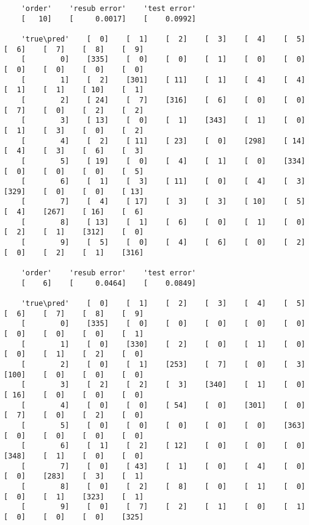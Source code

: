 \documentclass[fleqn]{article}
\theoremstyle{definition}
\theoremstyle{remark}
\begin{document}
\begin{verbatim}
    'order'    'resub error'    'test error'
    [   10]    [     0.0017]    [    0.0992]

    'true\pred'    [  0]    [  1]    [  2]    [  3]    [  4]    [  5]    [  6]    [  7]    [  8]    [  9]
    [        0]    [335]    [  0]    [  0]    [  1]    [  0]    [  0]    [  0]    [  0]    [  0]    [  0]
    [        1]    [  2]    [301]    [ 11]    [  1]    [  4]    [  4]    [  1]    [  1]    [ 10]    [  1]
    [        2]    [ 24]    [  7]    [316]    [  6]    [  0]    [  0]    [  7]    [  0]    [  2]    [  2]
    [        3]    [ 13]    [  0]    [  1]    [343]    [  1]    [  0]    [  1]    [  3]    [  0]    [  2]
    [        4]    [  2]    [ 11]    [ 23]    [  0]    [298]    [ 14]    [  4]    [  3]    [  6]    [  3]
    [        5]    [ 19]    [  0]    [  4]    [  1]    [  0]    [334]    [  0]    [  0]    [  0]    [  5]
    [        6]    [  1]    [  3]    [ 11]    [  0]    [  4]    [  3]    [329]    [  0]    [  0]    [ 13]
    [        7]    [  4]    [ 17]    [  3]    [  3]    [ 10]    [  5]    [  4]    [267]    [ 16]    [  6]
    [        8]    [ 13]    [  1]    [  6]    [  0]    [  1]    [  0]    [  2]    [  1]    [312]    [  0]
    [        9]    [  5]    [  0]    [  4]    [  6]    [  0]    [  2]    [  0]    [  2]    [  1]    [316]

    'order'    'resub error'    'test error'
    [    6]    [     0.0464]    [    0.0849]

    'true\pred'    [  0]    [  1]    [  2]    [  3]    [  4]    [  5]    [  6]    [  7]    [  8]    [  9]
    [        0]    [335]    [  0]    [  0]    [  0]    [  0]    [  0]    [  0]    [  0]    [  0]    [  1]
    [        1]    [  0]    [330]    [  2]    [  0]    [  1]    [  0]    [  0]    [  1]    [  2]    [  0]
    [        2]    [  0]    [  1]    [253]    [  7]    [  0]    [  3]    [100]    [  0]    [  0]    [  0]
    [        3]    [  2]    [  2]    [  3]    [340]    [  1]    [  0]    [ 16]    [  0]    [  0]    [  0]
    [        4]    [  0]    [  0]    [ 54]    [  0]    [301]    [  0]    [  7]    [  0]    [  2]    [  0]
    [        5]    [  0]    [  0]    [  0]    [  0]    [  0]    [363]    [  0]    [  0]    [  0]    [  0]
    [        6]    [  1]    [  2]    [ 12]    [  0]    [  0]    [  0]    [348]    [  1]    [  0]    [  0]
    [        7]    [  0]    [ 43]    [  1]    [  0]    [  4]    [  0]    [  0]    [283]    [  3]    [  1]
    [        8]    [  0]    [  2]    [  8]    [  0]    [  1]    [  0]    [  0]    [  1]    [323]    [  1]
    [        9]    [  0]    [  7]    [  2]    [  1]    [  0]    [  1]    [  0]    [  0]    [  0]    [325]


\end{verbatim}
\end{document}
